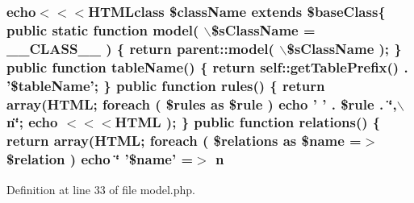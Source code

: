 \hypertarget{templates_2model_2model_8php_a379b45186169096aa004a82fc6fee26d}{
\subsubsection[{n}]{\setlength{\rightskip}{0pt plus 5cm}echo$<$$<$$<$HTMLclass \$className extends \$baseClass\{ public static function model( $\backslash$\$sClassName = \_\-\_\-CLASS\_\-\_\- ) \{ return parent::model( $\backslash$\$sClassName ); \} public function tableName() \{ return self::getTablePrefix() . '\$tableName'; \} public function rules() \{ return {\bf array}({\bf HTML}; {\bf foreach} ( \$rules as \$rule ) echo ' ' . \$rule . \char`\"{},$\backslash$n\char`\"{}; echo $<$$<$$<${\bf HTML} ); \} public function relations() \{ return {\bf array}({\bf HTML}; {\bf foreach} ( \$relations as \$name =$>$ \$relation ) echo \char`\"{} '\$name' =$>$ {\bf n}}}
\label{templates_2model_2model_8php_a379b45186169096aa004a82fc6fee26d}


Definition at line 33 of file model.php.

